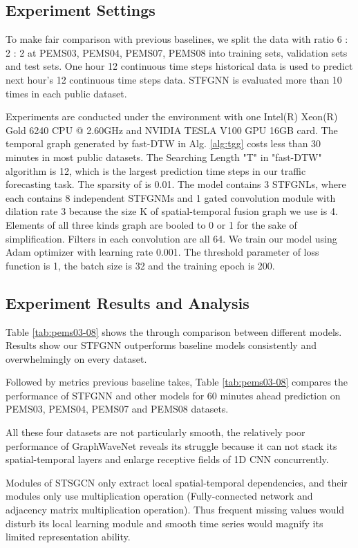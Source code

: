 \documentclass[letterpaper]{article} \usepackage{aaai21}  \usepackage{times}  \usepackage{helvet} \usepackage{courier}  \usepackage[hyphens]{url}  \usepackage{graphicx} \urlstyle{rm} \def\UrlFont{\rm}  \usepackage{natbib}  \usepackage{caption} \frenchspacing  \setlength{\pdfpagewidth}{8.5in}  \setlength{\pdfpageheight}{11in}  \usepackage{multirow}
\begin{document}
\subsection{Experiment Settings}
To make fair comparison with previous baselines, we split the data with ratio 6 : 2 : 2 at PEMS03, PEMS04, PEMS07, PEMS08 into training sets, validation sets and test sets. One hour 12 continuous time steps historical data is used to predict next hour's 12 continuous time steps data. STFGNN is evaluated more than 10 times in each public dataset.

Experiments are conducted under the environment with one Intel(R) Xeon(R) Gold 6240 CPU @ 2.60GHz and NVIDIA TESLA V100 GPU 16GB card. The temporal graph  generated by fast-DTW in Alg. \ref{alg:tgg} costs less than 30 minutes in most public datasets. The Searching Length "T" in "fast-DTW" algorithm is 12, which is the largest prediction time steps in our traffic forecasting task. The sparsity of  is 0.01. The model contains 3 STFGNLs, where each contains 8 independent STFGNMs and 1 gated convolution module with dilation rate 3 because the size K of spatial-temporal fusion graph we use is 4. Elements of all three kinds graph are booled to 0 or 1 for the sake of simplification. Filters in each convolution are all 64. We train our model using Adam optimizer with learning rate 0.001. The threshold parameter of loss function  is 1, the batch size is 32 and the training epoch is 200. 

\subsection{Experiment Results and Analysis}

Table \ref{tab:pems03-08} shows the through comparison between different models. Results show our STFGNN outperforms baseline models consistently and overwhelmingly on every dataset.

Followed by metrics previous baseline\cite{song2020spatial} takes, Table \ref{tab:pems03-08} compares the performance of STFGNN and other models for 60 minutes ahead prediction on PEMS03, PEMS04, PEMS07 and PEMS08 datasets.

All these four datasets are not particularly smooth, the relatively poor performance of GraphWaveNet reveals its struggle because it can not stack its spatial-temporal layers and enlarge receptive fields of 1D CNN concurrently. 

Modules of STSGCN only extract local spatial-temporal dependencies, and their modules only use multiplication operation (Fully-connected network and adjacency matrix multiplication operation). Thus frequent missing values would disturb its local learning module and smooth time series would magnify its limited representation ability. 
\end{document}
